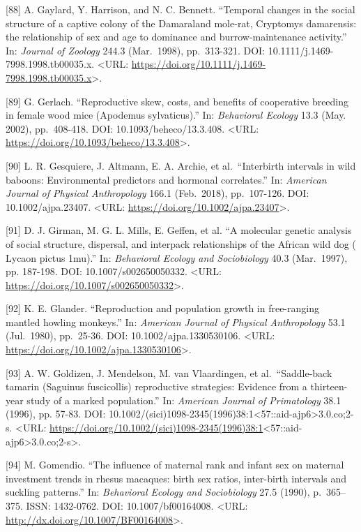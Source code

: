 \documentclass[
]{article}
\begin{document}
{[}88{]} A. Gaylard, Y. Harrison, and N. C. Bennett. ``Temporal changes
in the social structure of a captive colony of the Damaraland mole-rat,
Cryptomys damarensis: the relationship of sex and age to dominance and
burrow-maintenance activity.'' In: \emph{Journal of Zoology} 244.3
(Mar.~1998), pp.~313-321. DOI: 10.1111/j.1469-7998.1998.tb00035.x.
\textless URL:
\url{https://doi.org/10.1111/j.1469-7998.1998.tb00035.x}\textgreater.

{[}89{]} G. Gerlach. ``Reproductive skew, costs, and benefits of
cooperative breeding in female wood mice (Apodemus sylvaticus).'' In:
\emph{Behavioral Ecology} 13.3 (May. 2002), pp.~408-418. DOI:
10.1093/beheco/13.3.408. \textless URL:
\url{https://doi.org/10.1093/beheco/13.3.408}\textgreater.

{[}90{]} L. R. Gesquiere, J. Altmann, E. A. Archie, et al.~``Interbirth
intervals in wild baboons: Environmental predictors and hormonal
correlates.'' In: \emph{American Journal of Physical Anthropology} 166.1
(Feb.~2018), pp.~107-126. DOI: 10.1002/ajpa.23407. \textless URL:
\url{https://doi.org/10.1002/ajpa.23407}\textgreater.

{[}91{]} D. J. Girman, M. G. L. Mills, E. Geffen, et al. ``A molecular
genetic analysis of social structure, dispersal, and interpack
relationships of the African wild dog ( Lycaon pictus \mkern1mu).'' In:
\emph{Behavioral Ecology and Sociobiology} 40.3 (Mar.~1997), pp.
187-198. DOI: 10.1007/s002650050332. \textless URL:
\url{https://doi.org/10.1007/s002650050332}\textgreater.

{[}92{]} K. E. Glander. ``Reproduction and population growth in
free-ranging mantled howling monkeys.'' In: \emph{American Journal of
Physical Anthropology} 53.1 (Jul.~1980), pp.~25-36. DOI:
10.1002/ajpa.1330530106. \textless URL:
\url{https://doi.org/10.1002/ajpa.1330530106}\textgreater.

{[}93{]} A. W. Goldizen, J. Mendelson, M. van Vlaardingen, et
al.~``Saddle-back tamarin (Saguinus fuscicollis) reproductive
strategies: Evidence from a thirteen-year study of a marked
population.'' In: \emph{American Journal of Primatology} 38.1 (1996),
pp. 57-83. DOI:
10.1002/(sici)1098-2345(1996)38:1\textless57::aid-ajp6\textgreater3.0.co;2-s.
\textless URL:
\url{https://doi.org/10.1002/(sici)1098-2345(1996)38:1}\textless57::aid-ajp6\textgreater3.0.co;2-s\textgreater.

{[}94{]} M. Gomendio. ``The influence of maternal rank and infant sex on
maternal investment trends in rhesus macaques: birth sex ratios,
inter-birth intervals and suckling patterns.'' In: \emph{Behavioral
Ecology and Sociobiology} 27.5 (1990), p.~365--375. ISSN: 1432-0762.
DOI: 10.1007/bf00164008. \textless URL:
\url{http://dx.doi.org/10.1007/BF00164008}\textgreater.
\end{document}
